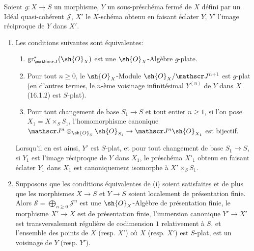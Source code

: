 \begin{proposition}[19.4.6]
\label{IV.19.4.6}
Soient $g:X\to S$ un morphisme, $Y$ un sous-préschéma fermé de $X$ défini par un Idéal quasi-cohérent $\mathscr J$, $X'$ le $X$-schéma obtenu en faisant éclater $Y$, $Y'$ l'image réciproque de $Y$ dans $X'$.
\begin{enumerate}
  \item[(i)] Les conditions suivantes sont équivalentes:
  \begin{enumerate}
    \item[a)] $\operatorname{gr}_{\mathscr J}^*(\sh{O}_X)$ est une $\sh{O}_X$-Algèbre $g$-plate.
    \item[b)] Pour tout $n\geq0$, le $\sh{O}_X$-Module $\sh{O}_X/\mathscr J^{n+1}$ est $g$-plat (en d'autres termes, le $n$-ème voisinage infinitésimal $Y^{(n)}$ de $Y$ dans $X$ (16.1.2) est $S$-plat).
    \item[c)] Pour tout changement de base $S_1\to S$ et tout entier $n\geq1$, si l'on pose $X_1=X\times_S S_1$, l'homomorphisme canonique $\mathscr J^n\otimes_{\sh{O}_S}\sh{O}_{S_1}\to\mathscr J^n\sh{O}_{X_1}$ est bijectif.
  \end{enumerate}
  Lorsqu'il en est ainsi, $Y'$ est $S$-plat, et pour tout changement de base $S_1\to S$, si $Y_1$ est l'image réciproque de $Y$ dans $X_1$, le préschéma $X'_1$ obtenu en faisant éclater $Y_1$ dans $X_1$ est canoniquement isomorphe à $X'\times_S S_1$.
  \item[(ii)] Supposons que les conditions équivalentes de (i) soient satisfaites et de plus que les morphismes $X\to S$ et $Y\to S$ soient localement de présentation finie. Alors $\mathscr S=\bigoplus_{n\geq0}\mathscr J^n$ est une $\sh{O}_X$-Algèbre de présentation finie, le morphisme $X'\to X$ est de présentation finie, l'immersion canonique $Y'\to X'$ est transversalement régulière de codimension $1$ relativement à $S$, et l'ensemble des points de $X$ (resp. $X'$) où $X$ (resp. $X'$) est $S$-plat, est un voisinage de $Y$ (resp. $Y'$).
\end{enumerate}
\end{proposition}

